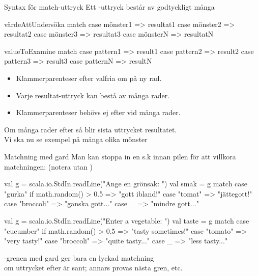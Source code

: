 \begin{Slide}{Syntax för match-uttryck}
Ett -uttryck består av godtyckligt många 
\ifswedish
\begin{Code}
  värdeAttUndersöka match {
    case mönster1 => resultat1
    case mönster2 => resultat2
    case mönster3 => resultat3
    case mönsterN => resultatN
  }
\end{Code}
\else
\begin{Code}
  valueToExamine match {
    case pattern1 => result1
    case pattern2 => result2
    case pattern3 => result3
    case patternN => resultN
  }
\end{Code}
\fi{}
\begin{itemize}
  \item Klammerparenteser efter  valfria om  på ny rad.
  \item Varje resultat-uttryck kan bestå av många rader. 
  \item  Klammerparenteser behövs ej efter \code{=>} vid många rader. 
\end{itemize}
\vspace{1em}
Om många rader efter  så blir sista uttrycket resultatet. \\
Vi ska nu se exempel på många olika mönster 

\end{Slide}
  


\begin{Slide}{Matchning med gard}
Man kan stoppa in en s.k   innan pilen \code{=>} för att villkora matchningen: (notera  utan )
\ifswedish
\begin{Code}
val g = scala.io.StdIn.readLine("Ange en grönsak: ")
val smak = g match 
  case "gurka" if math.random() > 0.5 => "gott ibland!"
  case "tomat" => "jättegott!"
  case "broccoli" => "ganska gott..."
  case _ => "mindre gott..."
\end{Code}
\else
\begin{Code}
val g = scala.io.StdIn.readLine("Enter a vegetable: ")
val taste = g match 
  case "cucumber" if math.random() > 0.5 => "tasty sometimes!"
  case "tomato" => "very tasty!"
  case "broccoli" => "quite tasty..."
  case _ => "less tasty..."
\end{Code}
\fi{}
-grenen med gard ger bara en lyckad matchning \\ om uttrycket efter  är sant; annars provas nästa gren, etc.
\end{Slide}

